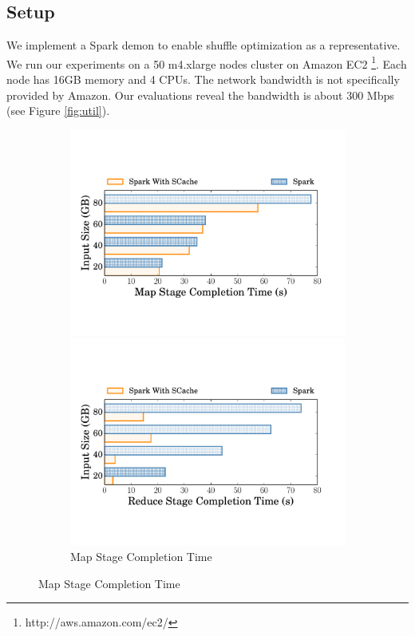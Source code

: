 \subsection{Setup}\label{stepup}
We implement a Spark demon to enable shuffle optimization as a representative.
We run our experiments on a 50 m4.xlarge nodes cluster on Amazon EC2 \footnote{http://aws.amazon.com/ec2/}. Each node has 16GB memory and 4 CPUs. The network bandwidth is not specifically provided by Amazon. Our evaluations reveal the bandwidth is about 300 Mbps (see Figure \ref{fig:util}).
\begin{figure}
	\centering
	\begin{minipage}[b]{.32\linewidth}
		\begin{subfigure}{\linewidth}
			\begin{minipage}{\linewidth}
				\includegraphics[width=\linewidth]{fig/groupbymapstage}
				\caption{Map Stage Completion Time}
				\label{fig:mapstage}
			\end{minipage}
			\begin{minipage}{\linewidth}
				\includegraphics[width=\linewidth]{fig/groupbyreducestage}

\end{minipage}
\end{subfigure}
\end{minipage}
\end{figure}
